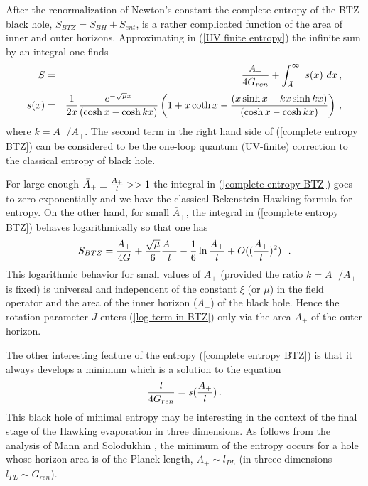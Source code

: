 \documentclass[12pt]{article}
\def\be{\begin{eqnarray}}
\def\ee{\end{eqnarray}}
\def\lb{\label}
\def\o{\over}
\begin{document}
After the renormalization of Newton's constant the complete entropy of the BTZ black hole, $S_{BTZ}=S_{BH}+S_{ent}$, is a rather complicated function of
the area of inner and outer horizons. Approximating in (\ref{UV finite entropy}) the infinite sum by an integral one finds \cite{Mann:1996ze}
\begin{eqnarray}
S&=&{A_+\over 4G_{ren}}+\int_{\bar{A}_+}^\infty
~s(x)~dx \, ,\nonumber \\
s(x)&=&{1\over 2x}{e^{-\sqrt{\mu}x}\over (\cosh x-\cosh kx)}
\left(1+x \coth x - {(x\sinh x -
kx \sinh kx )\over (\cosh x-\cosh kx)}
\right)\, ,
\label{complete entropy BTZ}
\end{eqnarray}
where  $k=A_-/A_+$.
The second term in the right hand side of (\ref{complete entropy BTZ}) can be 
considered  to be the one-loop
quantum (UV-finite) correction to the classical entropy of black hole.

For large enough $\bar{A}_+\equiv {A_+\over l}>>1$ the integral in (\ref{complete entropy BTZ}) goes to zero exponentially
 and we have the classical Bekenstein-Hawking formula for entropy.
On the other hand, for  small $\bar{A}_+$, the integral in (\ref{complete entropy BTZ})
 behaves logarithmically 
so that one has \cite{Mann:1996ze}
\begin{equation}
S_{BTZ}={A_+\over 4G}+{\sqrt{\mu}\over 6}{A_+\over l}-{1\over 6}\ln {A_+\over l}+
O(({A_+\over l})^2)~~.
\label{log term in BTZ}
\end{equation} 
 This 
logarithmic behavior for small values of $A_+$ (provided the ratio  $k=A_-/A_+$ is fixed) is universal and
independent of the constant $\xi$ 
(or $\mu$) in the field operator 
and the area of the inner horizon  ($A_-$) of the black hole. Hence
the rotation parameter $J$ enters (\ref{log term in BTZ}) only via the area $A_+$ 
of the outer horizon.

The other interesting feature of the entropy (\ref{complete entropy BTZ}) is that it always develops a minimum which is a solution to the equation
\be
{l\o 4 G_{ren}}=s({A_+\o l})\, .
\lb{minimal entropy}
\ee
This  black hole of minimal entropy may be interesting in the context of the final stage of the Hawking evaporation          
in three dimensions.   
As follows from the analysis of Mann and Solodukhin  \cite{Mann:1996ze}, the minimum of the entropy occurs for a hole whose horizon area  is of the Planck length, $A_+\sim l_{PL}$ (in threee dimensions
$l_{PL}\sim G_{ren}$).                
                             
                             
\end{document}
